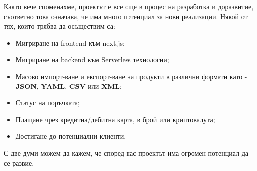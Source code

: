 \documentclass[a4paper]{article}
\begin{document}
\begin{Large}
Както вече споменахме, проектът е все още в процес на разработка и доразвитие, съответно това означава, че има много потенциал за нови реализации. Някой от тях, които трябва да осъществим са:

\begin{itemize}
\item Мигриране на frontend към next.js;
\item Мигриране на backend към Serverless технологии; \unsure
\item Масово импорт-ване и експорт-ване на продукти в различни формати като - \textbf{JSON}, \textbf{YAML}, \textbf{CSV} или \textbf{XML};
\item Статус на поръчката;
\item Плащане чрез кредитна/дебитна карта, в брой или криптовалута;
\item Достигане до потенциални клиенти.
\end{itemize}


С две думи можем да кажем, че според нас проектът има огромен
потенциал да се развие.

\end{Large}
\end{document}
